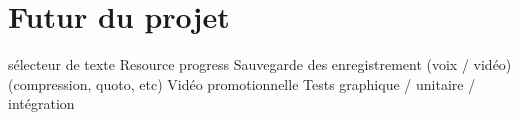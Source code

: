 \section{Futur du projet}
sélecteur de texte
Resource progress
Sauvegarde des enregistrement (voix / vidéo) (compression, quoto, etc)
Vidéo promotionnelle
Tests graphique / unitaire / intégration
